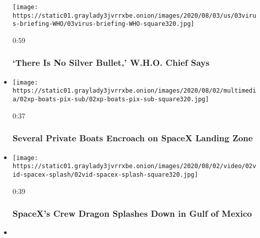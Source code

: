\begin{itemize}
  \texttt{[image: https://static01.graylady3jvrrxbe.onion/images/2020/08/03/us/03virus-briefing-WHO/03virus-briefing-WHO-square320.jpg]}

  0:59

  \hypertarget{there-is-no-silver-bullet-who-chief-says}{%
  \subsubsection{`There Is No Silver Bullet,' W.H.O. Chief
  Says}\label{there-is-no-silver-bullet-who-chief-says}}
\item
  \href{https://www.nytimes3xbfgragh.onion/video/us/100000007269193/boats-circle-spacex-capsule.html?action=click\&module=video-series-bar\&region=header\&pgtype=Article\&playlistId=video/latest-video}{}

  \texttt{[image: https://static01.graylady3jvrrxbe.onion/images/2020/08/02/multimedia/02xp-boats-pix-sub/02xp-boats-pix-sub-square320.jpg]}

  0:37

  \hypertarget{several-private-boats-encroach-on-spacex-landing-zone}{%
  \subsubsection{Several Private Boats Encroach on SpaceX Landing
  Zone}\label{several-private-boats-encroach-on-spacex-landing-zone}}
\item
  \href{https://www.nytimes3xbfgragh.onion/video/us/100000007269118/spacex-splash-down.html?action=click\&module=video-series-bar\&region=header\&pgtype=Article\&playlistId=video/latest-video}{}

  \texttt{[image: https://static01.graylady3jvrrxbe.onion/images/2020/08/02/video/02vid-spacex-splash/02vid-spacex-splash-square320.jpg]}

  0:39

  \hypertarget{spacexs-crew-dragon-splashes-down-in-gulf-of-mexico}{%
  \subsubsection{SpaceX's Crew Dragon Splashes Down in Gulf of
  Mexico}\label{spacexs-crew-dragon-splashes-down-in-gulf-of-mexico}}
\item
  \href{https://www.nytimes3xbfgragh.onion/video/world/australia/100000007269116/coronavirus-restrictions-melbourne.html?action=click\&module=video-series-bar\&region=header\&pgtype=Article\&playlistId=video/latest-video}{}


\end{itemize}
